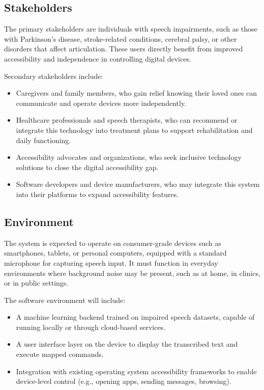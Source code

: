 \documentclass{article}
\begin{document}
\subsection{Stakeholders}
The primary stakeholders are individuals with speech impairments, such as those with Parkinson's disease, stroke-related conditions, cerebral palsy, or other disorders that affect articulation. These users directly benefit from improved accessibility and independence in controlling digital devices.

Secondary stakeholders include:
\begin{itemize}
  \item Caregivers and family members, who gain relief knowing their loved ones can communicate and operate devices more independently.
  \item Healthcare professionals and speech therapists, who can recommend or integrate this technology into treatment plans to support rehabilitation and daily functioning.
  \item Accessibility advocates and organizations, who seek inclusive technology solutions to close the digital accessibility gap.
  \item Software developers and device manufacturers, who may integrate this system into their platforms to expand accessibility features.
\end{itemize}

\subsection{Environment}
The system is expected to operate on consumer-grade devices such as smartphones, tablets, or personal computers, equipped with a standard microphone for capturing speech input. It must function in everyday environments where background noise may be present, such as at home, in clinics, or in public settings.

The software environment will include:
\begin{itemize}
  \item A machine learning backend trained on impaired speech datasets, capable of running locally or through cloud-based services.
  \item A user interface layer on the device to display the transcribed text and execute mapped commands.
  \item Integration with existing operating system accessibility frameworks to enable device-level control (e.g., opening apps, sending messages, browsing).
\end{itemize}
\end{document}
